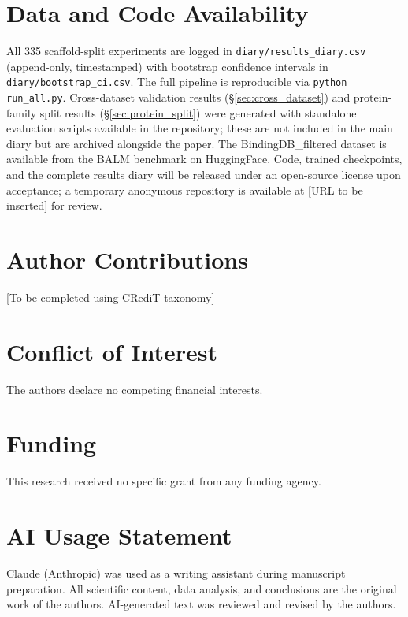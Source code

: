 \documentclass[11pt,twocolumn,a4paper]{article}
\begin{document}
\section*{Data and Code Availability}
All 335 scaffold-split experiments are logged in \texttt{diary/results\_diary.csv} (append-only, timestamped) with bootstrap confidence intervals in \texttt{diary/bootstrap\_ci.csv}. The full pipeline is reproducible via \texttt{python run\_all.py}. Cross-dataset validation results (\S\ref{sec:cross_dataset}) and protein-family split results (\S\ref{sec:protein_split}) were generated with standalone evaluation scripts available in the repository; these are not included in the main diary but are archived alongside the paper. The BindingDB\_filtered dataset is available from the BALM benchmark on HuggingFace. Code, trained checkpoints, and the complete results diary will be released under an open-source license upon acceptance; a temporary anonymous repository is available at [URL to be inserted] for review.

\section*{Author Contributions}
[To be completed using CRediT taxonomy]

\section*{Conflict of Interest}
The authors declare no competing financial interests.

\section*{Funding}
This research received no specific grant from any funding agency.

\section*{AI Usage Statement}
Claude (Anthropic) was used as a writing assistant during manuscript preparation. All scientific content, data analysis, and conclusions are the original work of the authors. AI-generated text was reviewed and revised by the authors.



\end{document}
